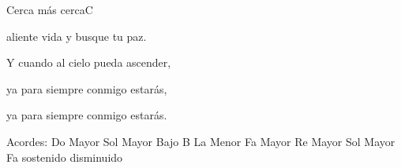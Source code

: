 \documentclass[12pt, spanish]{book}
\begin{document}
\begin{song}{Cerca más cerca}{C}
\begin{SBOpGroup}
            aliente vida y busque tu paz.

            Y cuando al cielo pueda ascender,

            ya para siempre conmigo estarás,

            ya para siempre conmigo estarás.
        \end{SBOpGroup}

        \ifChordBk
        \begin{SBOpGroup}
            Acordes:\break
            \upchord{\C}\qquad Do Mayor \hfill
            \upchord{\GB}\qquad Sol Mayor Bajo B \hfill\null\break
            \upchord{\Am}\qquad La Menor \hfill
            \upchord{\F}\qquad Fa Mayor \hfill\null\break
            \upchord{\D}\qquad Re Mayor \hfill
            \upchord{\G}\qquad Sol Mayor \hfill\null\break
            \upchord{\Fsdim}Fa sostenido disminuido \hfill\null\break
        \end{SBOpGroup}
        \fi
    \end{song}
\end{document}
